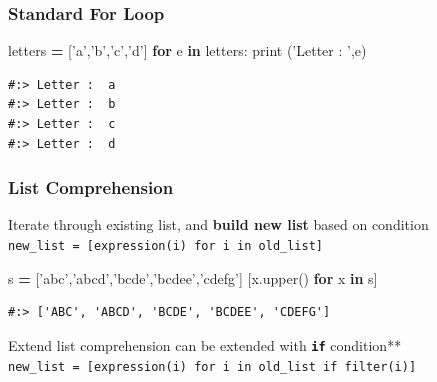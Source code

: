 \documentclass[
]{book}
\newenvironment{Shaded}{\begin{snugshade}}{\end{snugshade}}
\newcommand{\BuiltInTok}[1]{#1}
\newcommand{\ControlFlowTok}[1]{\textcolor[rgb]{0.27,0.27,0.27}{\textbf{#1}}}
\newcommand{\KeywordTok}[1]{\textcolor[rgb]{0.27,0.27,0.27}{\textbf{#1}}}
\newcommand{\NormalTok}[1]{#1}
\newcommand{\OperatorTok}[1]{\textcolor[rgb]{0.43,0.43,0.43}{\textbf{#1}}}
\newcommand{\StringTok}[1]{\textcolor[rgb]{0.5,0.5,0.5}{#1}}
\begin{document}
\hypertarget{standard-for-loop}{%
\subsubsection{Standard For Loop}\label{standard-for-loop}}

\begin{Shaded}
\begin{Highlighting}[]
\NormalTok{letters }\OperatorTok{=}\NormalTok{ [}\StringTok{'a'}\NormalTok{,}\StringTok{'b'}\NormalTok{,}\StringTok{'c'}\NormalTok{,}\StringTok{'d'}\NormalTok{]}
\ControlFlowTok{for}\NormalTok{ e }\KeywordTok{in}\NormalTok{ letters:}
    \BuiltInTok{print}\NormalTok{ (}\StringTok{'Letter : '}\NormalTok{,e)}
\end{Highlighting}
\end{Shaded}

\begin{verbatim}
#:> Letter :  a
#:> Letter :  b
#:> Letter :  c
#:> Letter :  d
\end{verbatim}

\hypertarget{list-comprehension-1}{%
\subsubsection{List Comprehension}\label{list-comprehension-1}}

Iterate through existing list, and \textbf{build new list} based on condition\\
\texttt{new\_list\ =\ {[}expression(i)\ for\ i\ in\ old\_list{]}}

\begin{Shaded}
\begin{Highlighting}[]
\NormalTok{s }\OperatorTok{=}\NormalTok{ [}\StringTok{'abc'}\NormalTok{,}\StringTok{'abcd'}\NormalTok{,}\StringTok{'bcde'}\NormalTok{,}\StringTok{'bcdee'}\NormalTok{,}\StringTok{'cdefg'}\NormalTok{]}
\NormalTok{[x.upper() }\ControlFlowTok{for}\NormalTok{ x }\KeywordTok{in}\NormalTok{ s]}
\end{Highlighting}
\end{Shaded}

\begin{verbatim}
#:> ['ABC', 'ABCD', 'BCDE', 'BCDEE', 'CDEFG']
\end{verbatim}

Extend list comprehension can be extended with \textbf{\texttt{if}} condition**\\
\texttt{new\_list\ =\ {[}expression(i)\ for\ i\ in\ old\_list\ if\ filter(i){]}}
\end{document}
